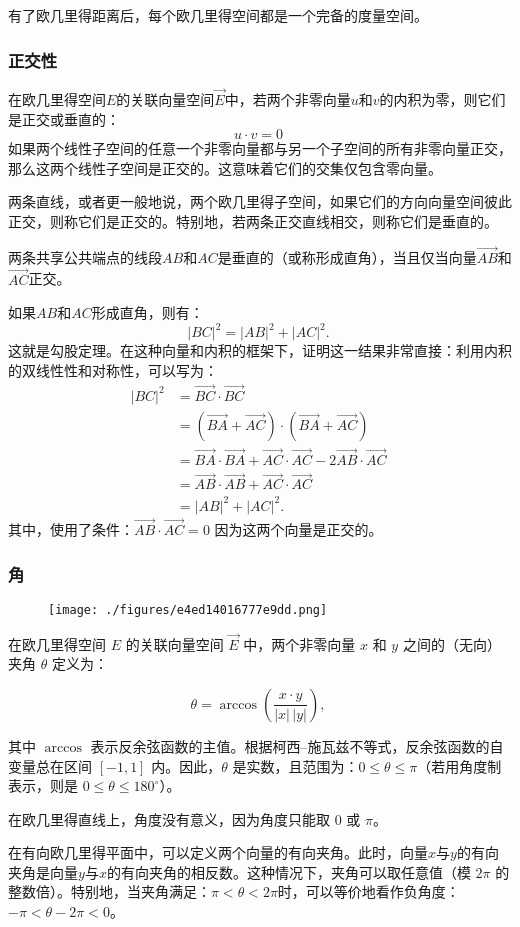 有了欧几里得距离后，每个欧几里得空间都是一个完备的度量空间。
\subsubsection{正交性}
在欧几里得空间$E$的关联向量空间$\overrightarrow{E}$中，若两个非零向量$u$和$v$的内积为零，则它们是正交或垂直的：
$$
u \cdot v = 0~
$$
如果两个线性子空间的任意一个非零向量都与另一个子空间的所有非零向量正交，那么这两个线性子空间是正交的。这意味着它们的交集仅包含零向量。

两条直线，或者更一般地说，两个欧几里得子空间，如果它们的方向向量空间彼此正交，则称它们是正交的。特别地，若两条正交直线相交，则称它们是垂直的。

两条共享公共端点的线段$AB$和$AC$是垂直的（或称形成直角），当且仅当向量$\overrightarrow{AB}$和$\overrightarrow{AC}$正交。

如果$AB$和$AC$形成直角，则有：
$$
|BC|^2 = |AB|^2 + |AC|^2.~
$$
这就是勾股定理。在这种向量和内积的框架下，证明这一结果非常直接：利用内积的双线性性和对称性，可以写为：
$$
\begin{aligned}
|BC|^2 
&= \overrightarrow{BC} \cdot \overrightarrow{BC} \\[4pt]
&= (\overrightarrow{BA} + \overrightarrow{AC}) \cdot (\overrightarrow{BA} + \overrightarrow{AC}) \\[4pt]
&= \overrightarrow{BA} \cdot \overrightarrow{BA} + \overrightarrow{AC} \cdot \overrightarrow{AC} - 2 \overrightarrow{AB} \cdot \overrightarrow{AC} \\[4pt]
&= \overrightarrow{AB} \cdot \overrightarrow{AB} + \overrightarrow{AC} \cdot \overrightarrow{AC} \\[4pt]
&= |AB|^2 + |AC|^2.
\end{aligned}~
$$
其中，使用了条件：$\overrightarrow{AB} \cdot \overrightarrow{AC} = 0$
因为这两个向量是正交的。
\subsubsection{角}
\begin{figure}[ht]
\centering
\texttt{[image: ./figures/e4ed14016777e9dd.png]}
\caption{} \label{fig_OJLDkj_3}
\end{figure}
在欧几里得空间 $E$ 的关联向量空间 $\overrightarrow{E}$ 中，两个非零向量 $x$ 和 $y$ 之间的\*\*（无向）夹角\*\* $\theta$ 定义为：

$$
\theta = \arccos\!\left(\frac{x \cdot y}{|x|\,|y|}\right),~
$$

其中 $\arccos$ 表示反余弦函数的主值。根据柯西–施瓦兹不等式，反余弦函数的自变量总在区间 $[-1, 1]$ 内。因此，$\theta$ 是实数，且范围为：$0 \leq \theta \leq \pi$（若用角度制表示，则是 $0 \leq \theta \leq 180^\circ$）。

在欧几里得直线上，角度没有意义，因为角度只能取 $0$ 或 $\pi$。

在有向欧几里得平面中，可以定义两个向量的有向夹角。此时，向量$x$与$y$的有向夹角是向量$y$与$x$的有向夹角的相反数。这种情况下，夹角可以取任意值（模 $2\pi$ 的整数倍）。特别地，当夹角满足：$\pi < \theta < 2\pi$时，可以等价地看作负角度：$-\pi < \theta - 2\pi < 0$。
